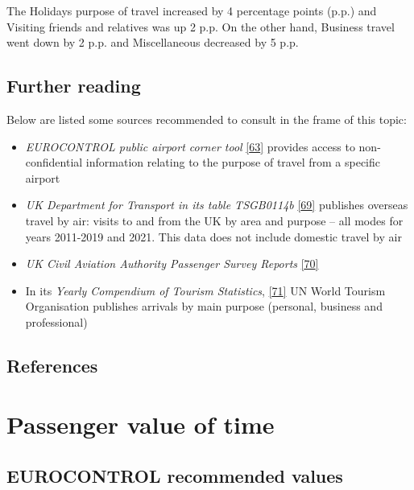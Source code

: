 \documentclass[
  11pt,
  a4paper,
]{book}
\begin{document}
The Holidays purpose of travel increased by 4 percentage points (p.p.)
and Visiting friends and relatives was up 2 p.p. On the other hand,
Business travel went down by 2 p.p. and Miscellaneous decreased by 5
p.p.

\hypertarget{further-reading-1}{%
\section{Further reading}\label{further-reading-1}}

Below are listed some sources recommended to consult in the frame of
this topic:

\begin{itemize}
\item
  \emph{EUROCONTROL public airport corner tool}
  \protect\hyperlink{ref-apt:corner}{{[}63{]}} provides access to
  non-confidential information relating to the purpose of travel from a
  specific airport
\item
  \emph{UK Department for Transport in its table TSGB0114b}
  \protect\hyperlink{ref-ukstats}{{[}69{]}} publishes overseas travel by
  air: visits to and from the UK by area and purpose -- all modes for
  years 2011-2019 and 2021. This data does not include domestic travel
  by air
\item
  \emph{UK Civil Aviation Authority Passenger Survey Reports}
  \protect\hyperlink{ref-paxsurvey}{{[}70{]}}
\item
  In its \emph{Yearly Compendium of Tourism Statistics},
  \protect\hyperlink{ref-untourism}{{[}71{]}} UN World Tourism
  Organisation publishes arrivals by main purpose (personal, business
  and professional)
\end{itemize}

\hypertarget{references-35}{%
\section{References}\label{references-35}}

\hypertarget{sec-passenger-value-of-time}{%
\chapter{Passenger value of time}\label{sec-passenger-value-of-time}}

\hypertarget{eurocontrol-recommended-values-34}{%
\section{EUROCONTROL recommended
values}\label{eurocontrol-recommended-values-34}}
\end{document}
